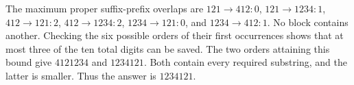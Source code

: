 The maximum proper suffix-prefix overlaps are $121\to412:0$, $121\to1234:1$, $412\to121:2$, $412\to1234:2$, $1234\to121:0$, and $1234\to412:1$. No block contains another. Checking the six possible orders of their first occurrences shows that at most three of the ten total digits can be saved. The two orders attaining this bound give $4121234$ and $1234121$. Both contain every required substring, and the latter is smaller. Thus the answer is $\boxed{1234121}$.

